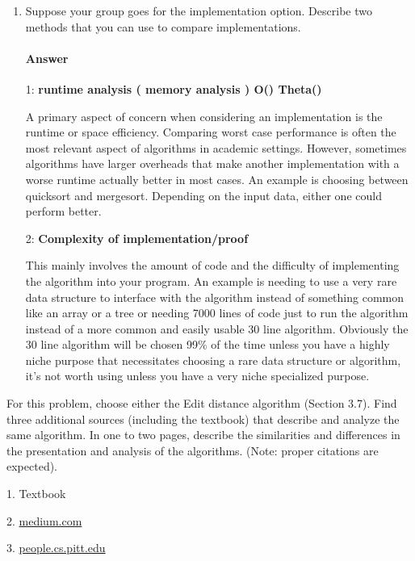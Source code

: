 \documentclass{article}
\begin{document}
\begin{enumerate}
    \item Suppose your group goes for the implementation option. Describe two
        methods that you can use to compare implementations.

        \paragraph{Answer}
    1: {\bf runtime analysis ( memory analysis ) O() Theta()}

A primary aspect of concern when considering an implementation is the runtime or space efficiency. Comparing worst case performance is often the most relevant aspect of algorithms in academic settings. However, sometimes algorithms have larger overheads that make another implementation with a worse runtime actually better in most cases. An example is choosing between quicksort and mergesort. Depending on the input data, either one could perform better.

    2: {\bf Complexity of implementation/proof}

This mainly involves the amount of code and the difficulty of implementing the algorithm into your program. An example is needing to use a very rare data structure to interface with the algorithm instead of something common like an array or a tree or needing 7000 lines of code just to run the algorithm instead of a more common and easily usable 30 line algorithm. Obviously the 30 line algorithm will be chosen 99\% of the time unless you have a highly niche purpose that necessitates choosing a rare data structure or algorithm, it's not worth using unless you have a very niche specialized purpose.

\end{enumerate}



For this problem, choose either the Edit distance algorithm (Section 3.7).
Find three additional sources (including the textbook) that describe
and analyze the same algorithm. In one to two pages, describe the similarities
and differences in the presentation and analysis of the algorithms. (Note:
proper citations are expected).

1. Textbook

2. \href{https://medium.com/@ethannam/understanding-the-levenshtein-distance-equation-for-beginners-c4285a5604f0}{medium.com}

3. \href{https://people.cs.pitt.edu/~kirk/cs1501/Pruhs/Spring2006/assignments/editdistance/Levenshtein%20Distance.htm}{people.cs.pitt.edu}
\end{document}
